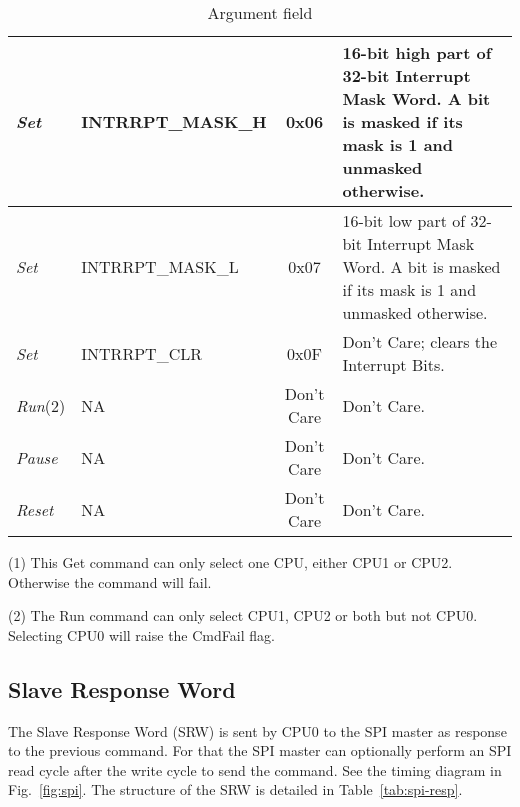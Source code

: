\documentclass{ug}
\theoremstyle{plain}
\begin{document}
\begin{table}[H]
\begin{center}
\begin{tabular}{|l|l|c|p{7cm}|}
      \rowcolor{iob-blue} \textit{Set} & INTRRPT\_MASK\_H & 0x06 & 16-bit high
      part of 32-bit Interrupt Mask Word. A bit is masked if its mask is 1 and
      unmasked otherwise.\\ \hline

      \textit{Set} & INTRRPT\_MASK\_L & 0x07 & 16-bit low
      part of 32-bit Interrupt Mask Word.  A bit is masked if its mask is 1 and
      unmasked otherwise.\\ \hline

      \rowcolor{iob-blue} \textit{Set} & INTRRPT\_CLR & 0x0F & Don't Care; clears
      the Interrupt Bits.\\ \hline

      \textit{Run}(2) & NA & Don't Care & Don't Care. \\ \hline

      \rowcolor{iob-blue} 
      \textit{Pause} & NA & Don't Care & Don't Care.\\ \hline

      \textit{Reset} & NA & Don't Care & Don't Care.\\ \hline

    \end{tabular}
    \caption{Argument field}
    \label{tab:spi-args}
  \end{center}
  (1) This Get command can only select one CPU, either CPU1 or
  CPU2. Otherwise the command will fail.

  (2) The Run command can only select CPU1, CPU2 or both but not
  CPU0. Selecting CPU0 will raise the CmdFail flag.
\end{table}

\clearpage

\subsection{Slave Response Word}

The Slave Response Word (SRW) is sent by CPU0 to the SPI master as
response to the previous command. For that the SPI master can
optionally perform an SPI read cycle after the write cycle to send the
command. See the timing diagram in Fig.~\ref{fig:spi}. The structure
of the SRW is detailed in Table~\ref{tab:spi-resp}.
\end{document}
